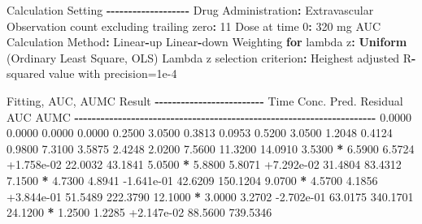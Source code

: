 \documentclass[
  12pt,
]{krantz}
\newenvironment{Shaded}{\begin{snugshade}}{\end{snugshade}}
\newcommand{\ControlFlowTok}[1]{\textcolor[rgb]{0.13,0.29,0.53}{\textbf{#1}}}
\newcommand{\DecValTok}[1]{\textcolor[rgb]{0.00,0.00,0.81}{#1}}
\newcommand{\FloatTok}[1]{\textcolor[rgb]{0.00,0.00,0.81}{#1}}
\newcommand{\KeywordTok}[1]{\textcolor[rgb]{0.13,0.29,0.53}{\textbf{#1}}}
\newcommand{\NormalTok}[1]{#1}
\newcommand{\OperatorTok}[1]{\textcolor[rgb]{0.81,0.36,0.00}{\textbf{#1}}}
\newcommand{\StringTok}[1]{\textcolor[rgb]{0.31,0.60,0.02}{#1}}
\begin{document}
\begin{Shaded}
\begin{Highlighting}[]
\NormalTok{Calculation Setting}
\OperatorTok{{-}{-}{-}{-}{-}{-}{-}{-}{-}{-}{-}{-}{-}{-}{-}{-}{-}{-}{-}}
\NormalTok{Drug Administration}\OperatorTok{:}\StringTok{ }\NormalTok{Extravascular}
\NormalTok{Observation count excluding trailing zero}\OperatorTok{:}\StringTok{ }\DecValTok{11}
\NormalTok{Dose at time }\DecValTok{0}\OperatorTok{:}\StringTok{ }\DecValTok{320}\NormalTok{ mg}
\NormalTok{AUC Calculation Method}\OperatorTok{:}\StringTok{ }\NormalTok{Linear}\OperatorTok{{-}}\NormalTok{up Linear}\OperatorTok{{-}}\NormalTok{down}
\NormalTok{Weighting }\ControlFlowTok{for}\NormalTok{ lambda z}\OperatorTok{:}\StringTok{ }\KeywordTok{Uniform}\NormalTok{ (Ordinary Least Square, OLS)}
\NormalTok{Lambda z selection criterion}\OperatorTok{:}\StringTok{ }\NormalTok{Heighest adjusted R}\OperatorTok{{-}}\NormalTok{squared value with precision=}\FloatTok{1e{-}4}


\NormalTok{Fitting, AUC, AUMC Result}
\OperatorTok{{-}{-}{-}{-}{-}{-}{-}{-}{-}{-}{-}{-}{-}{-}{-}{-}{-}{-}{-}{-}{-}{-}{-}{-}{-}}
\StringTok{      }\NormalTok{Time         Conc.      Pred.   Residual       AUC       AUMC}
\OperatorTok{{-}{-}{-}{-}{-}{-}{-}{-}{-}{-}{-}{-}{-}{-}{-}{-}{-}{-}{-}{-}{-}{-}{-}{-}{-}{-}{-}{-}{-}{-}{-}{-}{-}{-}{-}{-}{-}{-}{-}{-}{-}{-}{-}{-}{-}{-}{-}{-}{-}{-}{-}{-}{-}{-}{-}{-}{-}{-}{-}{-}{-}{-}{-}{-}{-}{-}{-}{-}{-}}
\StringTok{     }\FloatTok{0.0000}       \FloatTok{0.0000}                           \FloatTok{0.0000}     \FloatTok{0.0000}
     \FloatTok{0.2500}       \FloatTok{3.0500}                           \FloatTok{0.3813}     \FloatTok{0.0953}
     \FloatTok{0.5200}       \FloatTok{3.0500}                           \FloatTok{1.2048}     \FloatTok{0.4124}
     \FloatTok{0.9800}       \FloatTok{7.3100}                           \FloatTok{3.5875}     \FloatTok{2.4248}
     \FloatTok{2.0200}       \FloatTok{7.5600}                          \FloatTok{11.3200}    \FloatTok{14.0910}
     \FloatTok{3.5300} \OperatorTok{*}\StringTok{     }\FloatTok{6.5900}     \FloatTok{6.5724} \FloatTok{+1.758e{-}02}    \FloatTok{22.0032}    \FloatTok{43.1841}
     \FloatTok{5.0500} \OperatorTok{*}\StringTok{     }\FloatTok{5.8800}     \FloatTok{5.8071} \FloatTok{+7.292e{-}02}    \FloatTok{31.4804}    \FloatTok{83.4312}
     \FloatTok{7.1500} \OperatorTok{*}\StringTok{     }\FloatTok{4.7300}     \FloatTok{4.8941} \FloatTok{{-}1.641e{-}01}    \FloatTok{42.6209}   \FloatTok{150.1204}
     \FloatTok{9.0700} \OperatorTok{*}\StringTok{     }\FloatTok{4.5700}     \FloatTok{4.1856} \FloatTok{+3.844e{-}01}    \FloatTok{51.5489}   \FloatTok{222.3790}
    \FloatTok{12.1000} \OperatorTok{*}\StringTok{     }\FloatTok{3.0000}     \FloatTok{3.2702} \FloatTok{{-}2.702e{-}01}    \FloatTok{63.0175}   \FloatTok{340.1701}
    \FloatTok{24.1200} \OperatorTok{*}\StringTok{     }\FloatTok{1.2500}     \FloatTok{1.2285} \FloatTok{+2.147e{-}02}    \FloatTok{88.5600}   \FloatTok{739.5346}


\end{Highlighting}
\end{Shaded}
\end{document}
